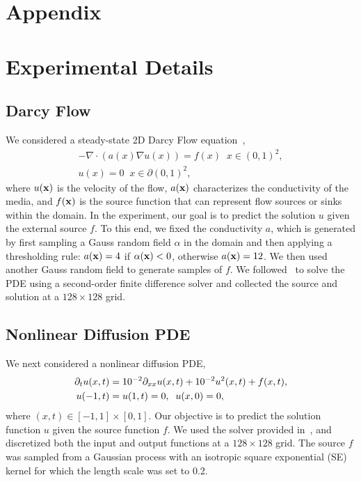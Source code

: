 \section*{Appendix}

\section{Experimental Details}\label{sect:detail}
\subsection{Darcy Flow}

We considered a steady-state 2D Darcy Flow equation~\citep{li2020fourier}, 
\begin{align}
    -\nabla \cdot (a(x)\nabla u(x)) = f(x)  \;\;  x \in (0,1)^2, \nonumber \\
    u(x)=0 \;\; x \in \partial(0,1)^2,
\end{align}
where $u({\bf x})$ is the velocity of the flow, $a({\bf x})$ characterizes the conductivity of the media, and $f({\bf x})$ is the source function that can represent flow sources or sinks within the domain. In the experiment, our goal is to predict the solution $u$ given the external source $f$. To this end, we fixed the conductivity $a$, which is generated by first sampling a Gauss random field $\alpha$ in the domain and then applying a thresholding rule: $a({\bf x}) = 4$ if $\alpha({\bf x})<0$, otherwise $a({\bf x}) = 12$. We then used another Gauss random field to generate samples of $f$. We followed~\citep{li2020fourier} to solve the PDE using a second-order finite difference solver and collected the source and solution at a $128 \times 128$ grid.

\subsection{Nonlinear Diffusion PDE}
We next considered a nonlinear diffusion PDE, 
\begin{align}
    \partial_t u(x,t) &= 10^{-2} \partial_{xx}u(x,t) + 10^{-2} u^2(x,t) + f(x,t), \notag \\
    u(-1,t) &= u(1,t) = 0, \;\; u(x, 0) = 0,  
\end{align}
where $(x, t) \in [-1, 1] \times [0, 1]$. Our objective is to predict the solution function $u$ given the source function $f$. We used the solver provided in~\citep{lu2022comprehensive}, and discretized both the input and output functions at a $128 \times 128$ grid. The source $f$ was sampled from a Gaussian process with an isotropic square exponential (SE) kernel for which the length scale was set to 0.2. 

